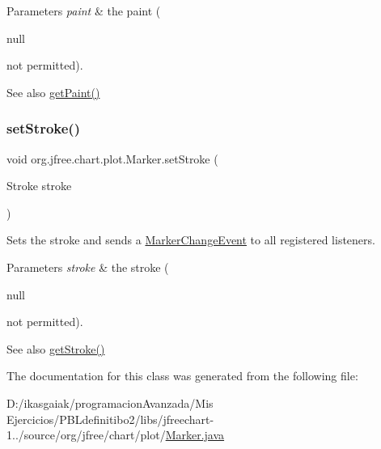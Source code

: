 \begin{DoxyParams}{Parameters}
{\em paint} & the paint (
\begin{DoxyCode}
null 
\end{DoxyCode}
 not permitted).\\
\hline
\end{DoxyParams}
\begin{DoxySeeAlso}{See also}
\mbox{\hyperlink{classorg_1_1jfree_1_1chart_1_1plot_1_1_marker_a65f07e12154446a3f6883ee55da268fd}{get\+Paint()}} 
\end{DoxySeeAlso}
\mbox{\label{classorg_1_1jfree_1_1chart_1_1plot_1_1_marker_a2bddd459ce4410c551943204d2be7dc0}} 
\subsubsection{\texorpdfstring{set\+Stroke()}{setStroke()}}
{\footnotesize\ttfamily void org.\+jfree.\+chart.\+plot.\+Marker.\+set\+Stroke (\begin{DoxyParamCaption}\item[{Stroke}]{stroke }\end{DoxyParamCaption})}

Sets the stroke and sends a \mbox{\hyperlink{}{Marker\+Change\+Event}} to all registered listeners.


\begin{DoxyParams}{Parameters}
{\em stroke} & the stroke (
\begin{DoxyCode}
null 
\end{DoxyCode}
 not permitted).\\
\hline
\end{DoxyParams}
\begin{DoxySeeAlso}{See also}
\mbox{\hyperlink{classorg_1_1jfree_1_1chart_1_1plot_1_1_marker_a43dd4fcef3afb93e3562988abb70d38b}{get\+Stroke()}} 
\end{DoxySeeAlso}


The documentation for this class was generated from the following file\+:\begin{DoxyCompactItemize}
\item 
D\+:/ikasgaiak/programacion\+Avanzada/\+Mis Ejercicios/\+P\+B\+Ldefinitibo2/libs/jfreechart-\/1../source/org/jfree/chart/plot/\mbox{\hyperlink{_marker_8java}{Marker.\+java}}\end{DoxyCompactItemize}
